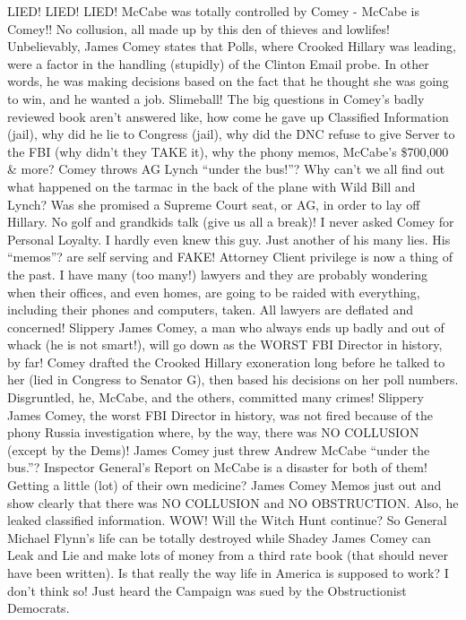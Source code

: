 LIED! LIED! LIED! McCabe was totally controlled by Comey - McCabe is
Comey!! No collusion, all made up by this den of thieves and lowlifes!
Unbelievably, James Comey states that Polls, where Crooked Hillary was
leading, were a factor in the handling (stupidly) of the Clinton Email
probe. In other words, he was making decisions based on the fact that he
thought she was going to win, and he wanted a job. Slimeball! The big
questions in Comey's badly reviewed book aren't answered like, how come
he gave up Classified Information (jail), why did he lie to Congress
(jail), why did the DNC refuse to give Server to the FBI (why didn't
they TAKE it), why the phony memos, McCabe's \$700,000 \& more? Comey
throws AG Lynch ``under the bus!''? Why can't we all find out what
happened on the tarmac in the back of the plane with Wild Bill and
Lynch? Was she promised a Supreme Court seat, or AG, in order to lay off
Hillary. No golf and grandkids talk (give us all a break)! I never asked
Comey for Personal Loyalty. I hardly even knew this guy. Just another of
his many lies. His ``memos''? are self serving and FAKE! Attorney Client
privilege is now a thing of the past. I have many (too many!) lawyers
and they are probably wondering when their offices, and even homes, are
going to be raided with everything, including their phones and
computers, taken. All lawyers are deflated and concerned! Slippery James
Comey, a man who always ends up badly and out of whack (he is not
smart!), will go down as the WORST FBI Director in history, by far!
Comey drafted the Crooked Hillary exoneration long before he talked to
her (lied in Congress to Senator G), then based his decisions on her
poll numbers. Disgruntled, he, McCabe, and the others, committed many
crimes! Slippery James Comey, the worst FBI Director in history, was not
fired because of the phony Russia investigation where, by the way, there
was NO COLLUSION (except by the Dems)! James Comey just threw Andrew
McCabe ``under the bus.''? Inspector General's Report on McCabe is a
disaster for both of them! Getting a little (lot) of their own medicine?
James Comey Memos just out and show clearly that there was NO COLLUSION
and NO OBSTRUCTION. Also, he leaked classified information. WOW! Will
the Witch Hunt continue? So General Michael Flynn's life can be totally
destroyed while Shadey James Comey can Leak and Lie and make lots of
money from a third rate book (that should never have been written). Is
that really the way life in America is supposed to work? I don't think
so! Just heard the Campaign was sued by the Obstructionist Democrats.
